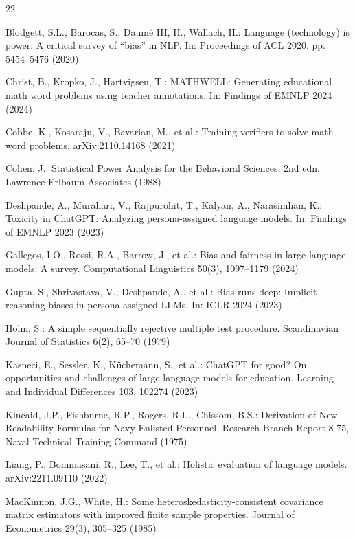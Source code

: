 \documentclass[runningheads]{llncs}
\begin{document}
\begin{thebibliography}{22}

 Blodgett, S.L., Barocas, S., Daum\'e III, H., Wallach, H.: Language (technology) is power: A critical survey of ``bias'' in NLP. In: Proceedings of ACL 2020. pp. 5454--5476 (2020)

 Christ, B., Kropko, J., Hartvigsen, T.: MATHWELL: Generating educational math word problems using teacher annotations. In: Findings of EMNLP 2024 (2024)

 Cobbe, K., Kosaraju, V., Bavarian, M., et al.: Training verifiers to solve math word problems. arXiv:2110.14168 (2021)

 Cohen, J.: Statistical Power Analysis for the Behavioral Sciences. 2nd edn. Lawrence Erlbaum Associates (1988)

 Deshpande, A., Murahari, V., Rajpurohit, T., Kalyan, A., Narasimhan, K.: Toxicity in ChatGPT: Analyzing persona-assigned language models. In: Findings of EMNLP 2023 (2023)

 Gallegos, I.O., Rossi, R.A., Barrow, J., et al.: Bias and fairness in large language models: A survey. Computational Linguistics 50(3), 1097--1179 (2024)

 Gupta, S., Shrivastava, V., Deshpande, A., et al.: Bias runs deep: Implicit reasoning biases in persona-assigned LLMs. In: ICLR 2024 (2023)

 Holm, S.: A simple sequentially rejective multiple test procedure. Scandinavian Journal of Statistics 6(2), 65--70 (1979)

 Kasneci, E., Sessler, K., K\"uchemann, S., et al.: ChatGPT for good? On opportunities and challenges of large language models for education. Learning and Individual Differences 103, 102274 (2023)

 Kincaid, J.P., Fishburne, R.P., Rogers, R.L., Chissom, B.S.: Derivation of New Readability Formulas for Navy Enlisted Personnel. Research Branch Report 8-75, Naval Technical Training Command (1975)

 Liang, P., Bommasani, R., Lee, T., et al.: Holistic evaluation of language models. arXiv:2211.09110 (2022)

 MacKinnon, J.G., White, H.: Some heteroskedasticity-consistent covariance matrix estimators with improved finite sample properties. Journal of Econometrics 29(3), 305--325 (1985)


\end{thebibliography}
\end{document}
